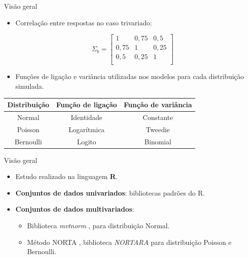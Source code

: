\documentclass[
  ignorenonframetext,
  serif,
  professionalfont,
  usenames,
  dvipsnames,
  aspectratio = 169]{beamer}
\begin{document}
\begin{frame}{Visão geral}
\protect\hypertarget{visuxe3o-geral-2}{}
\begin{itemize}
  \itemsep 2ex

  \item Correlação entre respostas no caso trivariado:

$$
\Sigma_b = 
\begin{bmatrix}
1    & 0,75 & 0,5  \\
0,75 & 1    & 0,25 \\
0,5  & 0,25 & 1    \\
\end{bmatrix}
$$

  \item Funções de ligação e variância utilizadas nos modelos para cada distribuição simulada.

\end{itemize}

\begin{table}[H]
\centering
\begin{tabular}{ccc}
\hline
Distribuição & Função de ligação & Função de variância \\ \hline
Normal       & Identidade        & Constante           \\
Poisson      & Logarítmica       & Tweedie             \\
Bernoulli    & Logito            & Binomial            \\ \hline
\end{tabular}
\end{table}
\end{frame}

\begin{frame}{Visão geral}
\protect\hypertarget{visuxe3o-geral-3}{}
\begin{itemize}
    \itemsep 2ex
    
  \item Estudo realizado na linguagem \textbf{R}.

  \item \textbf{Conjuntos de dados univariados}: bibliotecas padrões do R. 

  \item \textbf{Conjuntos de dados multivariados}:
    \begin{itemize}
      \item Biblioteca \emph{mvtnorm} \citep{mvtnorm1}, \citep{mvtnorm2} para distribuição Normal.

        \item Método NORTA \citep{cario1997modeling}, biblioteca \emph{NORTARA} \citep{nortara} para distribuição Poisson e Bernoulli.
    \end{itemize}
\end{itemize}
\end{frame}
\end{document}
